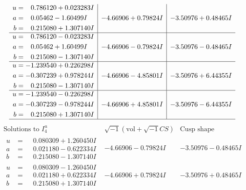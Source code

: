 \documentclass[1p]{elsarticle_modified}
\theoremstyle{definition}
\newcommand{\I}{\sqrt{-1}}
\begin{document}
$$\begin{array}{c|c|c}
\begin{aligned}
u &= \phantom{-}0.786120 + 0.023283 I \\
a &= \phantom{-}0.05462 - 1.60499 I \\
b &= \phantom{-}0.215080 + 1.307140 I\end{aligned}
 & -4.66906 + 0.79824 I & -3.50976 + 0.48465 I \\ \hline\begin{aligned}
u &= \phantom{-}0.786120 - 0.023283 I \\
a &= \phantom{-}0.05462 + 1.60499 I \\
b &= \phantom{-}0.215080 - 1.307140 I\end{aligned}
 & -4.66906 - 0.79824 I & -3.50976 - 0.48465 I \\ \hline\begin{aligned}
u &= -1.239540 + 0.226298 I \\
a &= -0.307239 + 0.978244 I \\
b &= \phantom{-}0.215080 - 1.307140 I\end{aligned}
 & -4.66906 - 4.85801 I & -3.50976 + 6.44355 I \\ \hline\begin{aligned}
u &= -1.239540 - 0.226298 I \\
a &= -0.307239 - 0.978244 I \\
b &= \phantom{-}0.215080 + 1.307140 I\end{aligned}
 & -4.66906 + 4.85801 I & -3.50976 - 6.44355 I\\
 \hline 
 \end{array}$$\newpage$$\begin{array}{c|c|c}  
\text{Solutions to }I^u_{4}& \I (\text{vol} + \sqrt{-1}CS) & \text{Cusp shape}\\
 \hline 
\begin{aligned}
u &= \phantom{-}0.080309 + 1.260450 I \\
a &= \phantom{-}0.021180 - 0.622334 I \\
b &= \phantom{-}0.215080 - 1.307140 I\end{aligned}
 & -4.66906 - 0.79824 I & -3.50976 - 0.48465 I \\ \hline\begin{aligned}
u &= \phantom{-}0.080309 - 1.260450 I \\
a &= \phantom{-}0.021180 + 0.622334 I \\
b &= \phantom{-}0.215080 + 1.307140 I\end{aligned}
 & -4.66906 + 0.79824 I & -3.50976 + 0.48465 I \\ \hline\begin{aligned}

\end{aligned}
\end{array}$$
\end{document}
